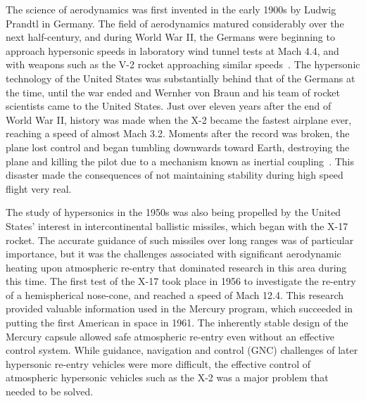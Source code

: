 The science of aerodynamics was first invented in the early 1900s by Ludwig Prandtl in Germany.
The field of aerodynamics matured considerably over the next half-century, and during World War II, the Germans were beginning to approach hypersonic speeds in laboratory wind  tunnel tests at Mach 4.4, and with weapons such as the V-2 rocket approaching similar speeds\ \cite{heppenheimer.heatbarrier.2009}.
The hypersonic technology of the United States was substantially behind that of the Germans at the time, until the war ended and Wernher von Braun and his team of rocket scientists came to the United States.
Just over eleven years after the end of World War II, history was made when the X-2 became the fastest airplane ever, reaching a speed of almost Mach 3.2.
Moments after the record was broken, the plane lost control and began tumbling downwards toward Earth, destroying the plane and killing the pilot due to a mechanism known as inertial coupling\ \cite{nelson.flightcontrol.1998}.
This disaster made the consequences of not maintaining stability during high speed flight very real.

The study of hypersonics in the 1950s was also being propelled by the United States' interest in intercontinental ballistic missiles, which began with the X-17 rocket.
The accurate guidance of such missiles over long ranges was of particular importance, but it was the challenges associated with significant aerodynamic heating upon atmospheric re-entry that dominated research in this area during this time.
The first test of the X-17 took place in 1956 to investigate the re-entry of a hemispherical nose-cone, and reached a speed of Mach 12.4.
This research provided valuable information used in the Mercury program, which succeeded in putting the first American in space in 1961.
The inherently stable design of the Mercury capsule allowed safe atmospheric re-entry even without an effective control system.
While guidance, navigation and control (GNC) challenges of later hypersonic re-entry vehicles were more difficult, the effective control of atmospheric hypersonic vehicles such as the X-2 was a major problem that needed to be solved.

